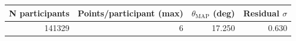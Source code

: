\begin{tabular}{rrrr}
\toprule
N participants & Points/participant (max) & $\theta_{\text{MAP}}$ (deg) & Residual $\sigma$ \\
\midrule
141329 & 6 & 17.250 & 0.630 \\
\bottomrule
\end{tabular}
